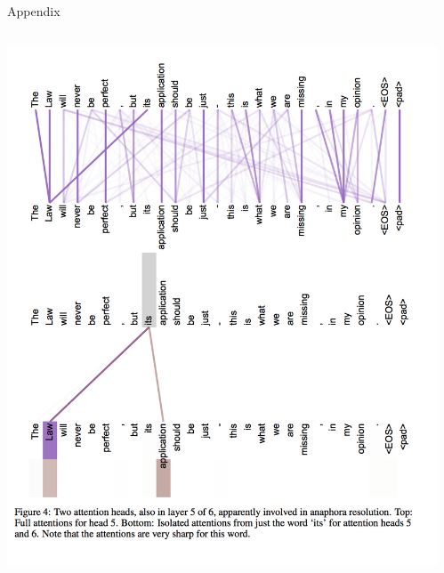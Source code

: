 \documentclass{beamer}
\begin{document}
\begin{frame}{Appendix}{}

\begin{columns}[T] %
\begin{column}{.48\textwidth}
\begin{minipage}[c][.48\textheight][c]{\linewidth}
\centering
\includegraphics[width=\textwidth]{img/attn_anaphora.png}
\end{minipage}
\end{column}%
\hfill%
\begin{column}{.48\textwidth}
\begin{minipage}[c][.48\textheight][c]{\linewidth}
\centering

\end{minipage}
\end{column}
\end{columns}
\end{frame}
\end{document}
